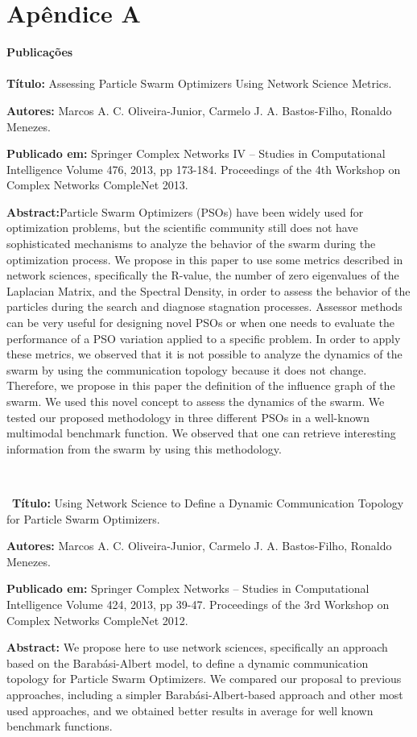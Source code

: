 \chapter*{Apêndice A}


\textbf{Publicações}
\\
\\


\textbf{Título:} Assessing Particle Swarm Optimizers Using Network Science Metrics.

\textbf{Autores:} Marcos A. C. Oliveira-Junior, Carmelo J. A. Bastos-Filho, Ronaldo Menezes.

\textbf{Publicado em:} Springer Complex Networks IV -- Studies in Computational Intelligence Volume 476, 2013, pp 173-184. Proceedings of the 4th Workshop on Complex Networks CompleNet 2013.

\textbf{Abstract:}Particle Swarm Optimizers (PSOs) have been widely used for optimization problems, but the scientific community still does not have sophisticated mechanisms to analyze the behavior of the swarm during the optimization process. We propose in this paper to use some metrics described in network sciences, specifically the R-value, the number of zero eigenvalues of the Laplacian Matrix, and the Spectral Density, in order to assess the behavior of the particles during the search and diagnose stagnation processes. Assessor methods can be very useful for designing novel PSOs or when one needs to evaluate the performance of a PSO variation applied to a specific problem. In order to apply these metrics, we observed that it is not possible to analyze the dynamics of the swarm by using the communication topology because it does not change. Therefore, we propose in this paper the definition of the influence graph of the swarm. We used this novel concept to assess the dynamics of the swarm. We tested our proposed methodology in three different PSOs in a well-known multimodal benchmark function. We observed that one can retrieve interesting information from the swarm by using this methodology.

\

\
\textbf{Título:} Using Network Science to Define a Dynamic Communication Topology for Particle Swarm Optimizers.

\textbf{Autores:} Marcos A. C. Oliveira-Junior, Carmelo J. A. Bastos-Filho, Ronaldo Menezes.

\textbf{Publicado em:} Springer Complex Networks -- Studies in Computational Intelligence Volume 424, 2013, pp 39-47. Proceedings of the 3rd Workshop on Complex Networks CompleNet 2012.

\textbf{Abstract:} We propose here to use network sciences, specifically an approach based on the Barabási-Albert model, to define a dynamic communication topology for Particle Swarm Optimizers. We compared our proposal to previous approaches, including a simpler Barabási-Albert-based approach and other most used approaches, and we obtained better results in average for well known benchmark functions.



\pagebreak
